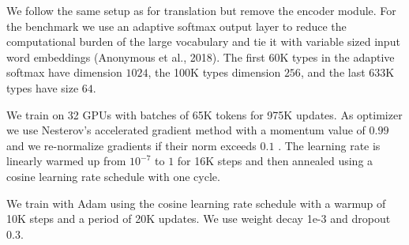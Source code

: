 We follow the same setup as for translation but remove the encoder module.
For the \gbw{} benchmark we use an adaptive softmax output layer to reduce the computational burden of the large vocabulary \citep{grave2016arxiv,press2017using} and tie it with variable sized input word embeddings (Anonymous et al., 2018). 
The first 60K types in the adaptive softmax have dimension $1024$, the 100K types dimension $256$, and the last 633K types have size $64$.

We train on 32 GPUs with batches of 65K tokens for 975K updates. As optimizer we use Nesterov's accelerated gradient method \citep{sutskever2013icml} with a momentum value of $0.99$ and we re-normalize gradients if their norm exceeds $0.1$ \citep{pascanu2013difficulty}.
The learning rate is linearly warmed up from $10^{-7}$ to $1$ for 16K steps and then annealed using a cosine learning rate schedule \citep{loshchilov2016cosine} with one cycle.

We train with Adam using the cosine learning rate schedule with a warmup of 10K steps and a period of 20K updates. 
We use weight decay 1e-3 and dropout 0.3. %
